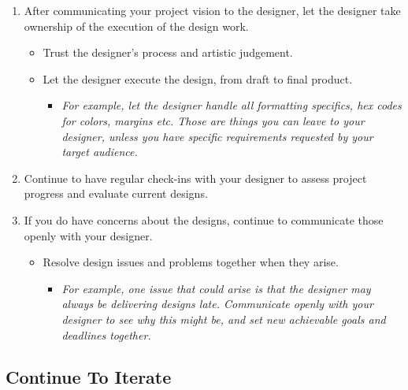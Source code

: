 \documentclass[
]{book}
\providecommand{\tightlist}{%
  \setlength{\itemsep}{0pt}\setlength{\parskip}{0pt}}
\begin{document}
\begin{enumerate}
\def\labelenumi{\arabic{enumi}.}
\tightlist
\item
  After communicating your project vision to the designer, let the designer take ownership of the execution of the design work.

  \begin{itemize}
  \tightlist
  \item
    Trust the designer's process and artistic judgement.
  \item
    Let the designer execute the design, from draft to final product.

    \begin{itemize}
    \tightlist
    \item
      \emph{For example, let the designer handle all formatting specifics, hex codes for colors, margins etc. Those are things you can leave to your designer, unless you have specific requirements requested by your target audience.}
    \end{itemize}
  \end{itemize}
\item
  Continue to have regular check-ins with your designer to assess project progress and evaluate current designs.
\item
  If you do have concerns about the designs, continue to communicate those openly with your designer.

  \begin{itemize}
  \tightlist
  \item
    Resolve design issues and problems together when they arise.

    \begin{itemize}
    \tightlist
    \item
      \emph{For example, one issue that could arise is that the designer may always be delivering designs late. Communicate openly with your designer to see why this might be, and set new achievable goals and deadlines together.}
    \end{itemize}
  \end{itemize}
\end{enumerate}

\hypertarget{continue-to-iterate}{%
\subsection{Continue To Iterate}\label{continue-to-iterate}}
\end{document}
